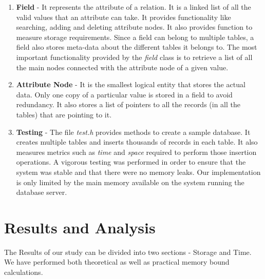 \documentclass[12pt, oneside]{book}
\begin{document}
\begin{enumerate}
 \item \textbf{Field} - It represents the attribute of a relation. It is a linked list of all the valid values that an attribute can take. It provides functionality like searching, adding and deleting attribute nodes. It also provides function to measure storage requirements. Since a field can belong to multiple tables, a field also stores meta-data about the different tables it belongs to. The most important functionality provided by the \emph{field} class is to retrieve a list of all the main nodes connected with the attribute node of a given value.
 \item \textbf{Attribute Node} - It is the smallest logical entity that stores the actual data. Only one copy of a particular value is stored in a field to avoid redundancy. It also stores a list of pointers to all the records (in all the tables) that are pointing to it.
 \item \textbf{Testing} - The file \emph{test.h} provides methods to create a sample database. It creates multiple tables and inserts thousands of records in each table. It also measures metrics such as \emph{time} and \emph{space} required to perform those insertion operations. A vigorous testing was performed in order to ensure that the system was stable and that there were no memory leaks. Our implementation is only limited by the main memory available on the system running the database server.
\end{enumerate}

\section{Results and Analysis}
The Results of our study can be divided into two sections - Storage and Time. We have performed both theoretical as well as practical memory bound calculations. \\
\end{document}
